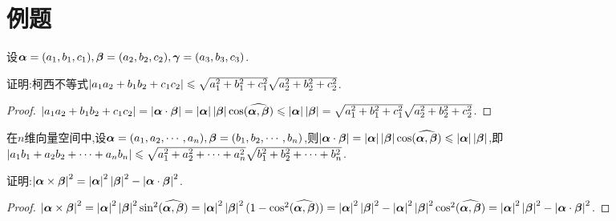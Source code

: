 \section{例题}
    设$\bm{\alpha}=(a_1,b_1,c_1),\bm{\beta}=(a_2,b_2,c_2),\bm{\gamma}=(a_3,b_3,c_3)$.
\begin{example}
    证明:柯西不等式$\left|a_1a_2+b_1b_2+c_1c_2\right|\leqslant\sqrt{a_1^2+b_1^2+c_1^2}\sqrt{a_2^2+b_2^2+c_2^2}$.
\end{example}

\begin{proof}
    $\left|a_1a_2+b_1b_2+c_1c_2\right|=\left|\bm{\alpha}\cdot\bm{\beta}\right|=\left|\bm{\alpha}\right|\left|\bm{\beta}\right|\cos(\widehat{\bm{\alpha},\bm{\beta}})\leqslant\left|\bm{\alpha}\right|\left|\bm{\beta}\right|=\sqrt{a_1^2+b_1^2+c_1^2}\sqrt{a_2^2+b_2^2+c_2^2}$.
\end{proof}

\begin{remark}
    在$n$维向量空间中,设$\bm{\alpha}=(a_1,a_2,\cdots,a_n),\bm{\beta}=(b_1,b_2,\cdots,b_n)$,则$\left|\bm{\alpha}\cdot\bm{\beta}\right|=\left|\bm{\alpha}\right|\left|\bm{\beta}\right|\cos(\widehat{\bm{\alpha},\bm{\beta}})\leqslant\left|\bm{\alpha}\right|\left|\bm{\beta}\right|$,即$\left|a_1b_1+a_2b_2+\cdots+a_nb_n\right|\leqslant\sqrt{a_1^2+a_2^2+\cdots+a_n^2}\sqrt{b_1^2+b_2^2+\cdots+b_n^2}$.
\end{remark}

\begin{example}
    证明:$\left|\bm{\alpha}\times\bm{\beta}\right|^2=\left|\bm{\alpha}\right|^2\left|\bm{\beta}\right|^2-\left|\bm{\alpha}\cdot\bm{\beta}\right|^2$.
\end{example}
\begin{proof}
    $\left|\bm{\alpha}\times\bm{\beta}\right|^2=\left|\bm{\alpha}\right|^2\left|\bm{\beta}\right|^2\sin^2(\widehat{\bm{\alpha},\bm{\beta}})=\left|\bm{\alpha}\right|^2\left|\bm{\beta}\right|^2(1-\cos^2(\widehat{\bm{\alpha},\bm{\beta}}))=\left|\bm{\alpha}\right|^2\left|\bm{\beta}\right|^2-\left|\bm{\alpha}\right|^2\left|\bm{\beta}\right|^2\cos^2(\widehat{\bm{\alpha},\bm{\beta}})=\left|\bm{\alpha}\right|^2\left|\bm{\beta}\right|^2-\left|\bm{\alpha}\cdot\bm{\beta}\right|^2$.
\end{proof}

